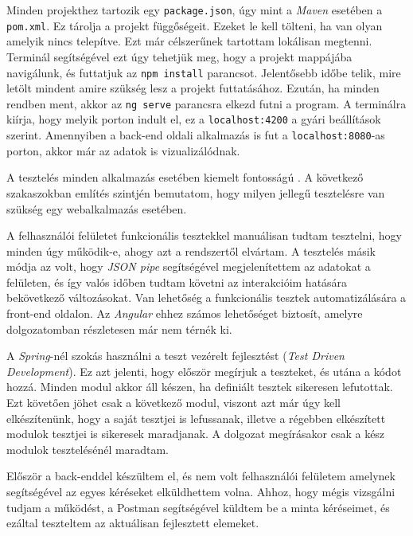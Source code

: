 Minden projekthez tartozik egy \texttt{package.json}, úgy mint a \textit{Maven} esetében a \texttt{pom.xml}. Ez tárolja a projekt függőségeit. Ezeket le kell tölteni, ha van olyan amelyik nincs telepítve. Ezt már célszerűnek tartottam lokálisan megtenni. Terminál segítségével ezt úgy tehetjük meg, hogy a projekt mappájába navigálunk, és futtatjuk az \texttt{npm install} parancsot. Jelentősebb időbe telik, mire letölt mindent amire szükség lesz a projekt futtatásához. Ezután, ha minden rendben ment, akkor az \texttt{ng serve} parancsra elkezd futni a program. A terminálra kiírja, hogy melyik porton indult el, ez a \texttt{localhost:4200} a gyári beállítások szerint. Amennyiben a back-end oldali alkalmazás is fut a \texttt{localhost:8080}-as porton, akkor már az adatok is vizualizálódnak.


A tesztelés minden alkalmazás esetében kiemelt fontosságú \cite{18}. A következő szakaszokban említés szintjén bemutatom, hogy milyen jellegű tesztelésre van szükség egy webalkalmazás esetében.


A felhasználói felületet funkcionális tesztekkel manuálisan tudtam tesztelni, hogy minden úgy működik-e, ahogy azt a rendszertől elvártam. A tesztelés másik módja az volt, hogy \textit{JSON pipe} segítségével megjelenítettem az adatokat a felületen, és így valós időben tudtam követni az interakcióim hatására bekövetkező változásokat. Van lehetőség a funkcionális tesztek automatizálására a front-end oldalon. Az \textit{Angular} ehhez számos lehetőséget biztosít, amelyre dolgozatomban részletesen már nem térnék ki.


A \textit{Spring}-nél szokás használni a teszt vezérelt fejlesztést (\textit{Test Driven Development}). Ez azt jelenti, hogy először megírjuk a teszteket, és utána a kódot hozzá. Minden modul akkor áll készen, ha definiált tesztek sikeresen lefutottak. Ezt követően jöhet csak a következő modul, viszont azt már úgy kell elkészítenünk, hogy a saját tesztjei is lefussanak, illetve a régebben elkészített modulok tesztjei is sikeresek maradjanak. A dolgozat megírásakor csak a kész modulok tesztelésénél maradtam.

Először a back-enddel készültem el, és nem volt felhasználói felületem amelynek segítségével az egyes kéréseket elküldhettem volna. Ahhoz, hogy mégis vizsgálni tudjam a működést, a Postman segítségével küldtem be a minta kéréseimet, és ezáltal teszteltem az aktuálisan fejlesztett elemeket.

